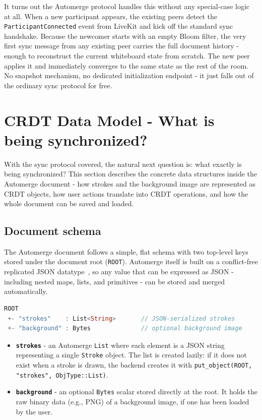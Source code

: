 \documentclass[a4paper,11pt,twoside]{report}
\theoremstyle{definition}
\begin{document}
It turns out the Automerge protocol handles this without any special-case logic at all. 
When a new participant appears, the existing peers detect the \texttt{ParticipantConnected} event 
from LiveKit and kick off the standard sync handshake. Because the newcomer starts with an empty 
Bloom filter, the very first sync message from any existing peer carries the full document history 
- enough to reconstruct the current whiteboard state from scratch. The new peer applies it and 
immediately converges to the same state as the rest of the room. No snapshot mechanism, 
no dedicated initialization endpoint - it just falls out of the ordinary sync protocol for free.

\section{CRDT Data Model - What is being synchronized?}

With the sync protocol covered, the natural next question is: what exactly is being synchronized? 
This section describes the concrete data structures inside the Automerge document - how strokes and 
the background image are represented as CRDT objects, how user actions translate into CRDT operations,
 and how the whole document can be saved and loaded.

\subsection{Document schema}

The Automerge document follows a simple, flat schema with two top-level keys stored under the 
document root (\texttt{ROOT}). Automerge itself is built on a conflict-free replicated JSON
datatype~\cite{kleppmann-jsoncrdt}, so any value that can be expressed as JSON - including
nested maps, lists, and primitives - can be stored and merged automatically.

\begin{lstlisting}[language=Rust]
ROOT
 +- "strokes"    : List<String>       // JSON-serialized strokes
 +- "background" : Bytes              // optional background image
\end{lstlisting}

\begin{itemize}
    \item \textbf{\texttt{strokes}} - an Automerge \texttt{List} where each element is a JSON 
    string representing a single \texttt{Stroke} object. The list is created lazily: if it does 
    not exist when a stroke is drawn, the backend creates it with 
    \texttt{put\_object(ROOT, "strokes", ObjType::List)}.
    
    \item \textbf{\texttt{background}} - an optional \texttt{Bytes} scalar stored directly at 
    the root. It holds the raw binary data (e.g., PNG) of a background image, if one has been 
    loaded by the user.
\end{itemize}
\end{document}
